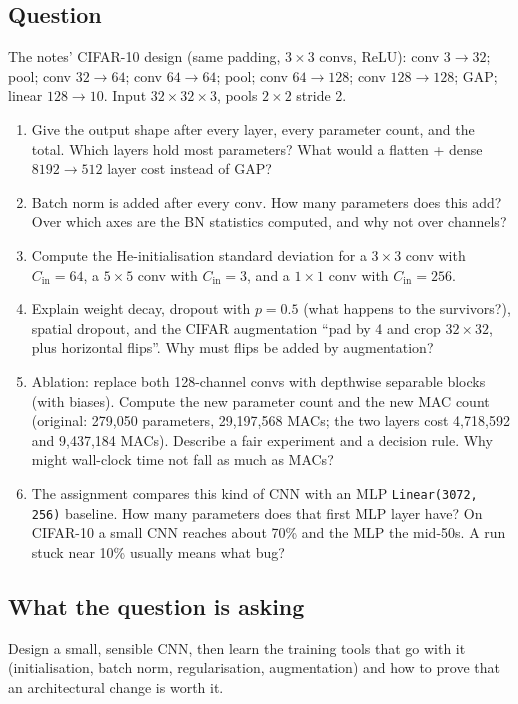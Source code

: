 \documentclass[12pt,a4paper]{article}
\begin{document}
\subsection*{Question}
The notes' CIFAR-10 design (same padding, $3\times3$ convs, ReLU): conv $3\to32$; pool; conv $32\to64$; conv $64\to64$; pool; conv $64\to128$; conv $128\to128$; GAP; linear $128\to10$. Input $32\times32\times3$, pools $2\times2$ stride 2.
\begin{enumerate}[label=(\alph*)]
\item Give the output shape after every layer, every parameter count, and the total. Which layers hold most parameters? What would a flatten + dense $8192\to512$ layer cost instead of GAP?
\item Batch norm is added after every conv. How many parameters does this add? Over which axes are the BN statistics computed, and why not over channels?
\item Compute the He-initialisation standard deviation for a $3\times3$ conv with $C_{\text{in}}=64$, a $5\times5$ conv with $C_{\text{in}}=3$, and a $1\times1$ conv with $C_{\text{in}}=256$.
\item Explain weight decay, dropout with $p=0.5$ (what happens to the survivors?), spatial dropout, and the CIFAR augmentation ``pad by 4 and crop $32\times32$, plus horizontal flips''. Why must flips be added by augmentation?
\item Ablation: replace both 128-channel convs with depthwise separable blocks (with biases). Compute the new parameter count and the new MAC count (original: 279{,}050 parameters, 29{,}197{,}568 MACs; the two layers cost 4{,}718{,}592 and 9{,}437{,}184 MACs). Describe a fair experiment and a decision rule. Why might wall-clock time not fall as much as MACs?
\item The assignment compares this kind of CNN with an MLP \texttt{Linear(3072, 256)} baseline. How many parameters does that first MLP layer have? On CIFAR-10 a small CNN reaches about 70\% and the MLP the mid-50s. A run stuck near 10\% usually means what bug?
\end{enumerate}

\subsection*{What the question is asking}
Design a small, sensible CNN, then learn the training tools that go with it (initialisation, batch norm, regularisation, augmentation) and how to prove that an architectural change is worth it.
\end{document}
